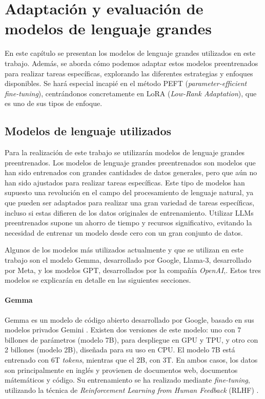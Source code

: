 \documentclass[11pt,spanish,listoffigures,listoftables]{tfgetsinf}
\begin{document}
\chapter{Adaptación y evaluación de modelos de lenguaje grandes} \label{cap3}

En este capítulo se presentan los modelos de lenguaje grandes utilizados en este trabajo. Además, se aborda cómo podemos adaptar estos modelos preentrenados para realizar tareas  específicas, explorando las diferentes estrategias y enfoques disponibles. Se hará especial incapié en el método PEFT  (\textit{parameter-efficient fine-tuning}), centrándonos concretamente en LoRA (\textit{Low-Rank Adaptation}), que es uno de sus tipos de enfoque.

\section{Modelos de lenguaje utilizados} \label{modelosUtilizados}

Para la realización de este trabajo se utilizarán modelos de lenguaje grandes preentrenados. Los modelos de lenguaje grandes preentrenados son modelos que han sido entrenados con grandes cantidades de datos generales, pero que aún no han sido ajustados para realizar tareas específicas. Este tipo de modelos han supuesto una revolución en el campo del procesamiento de lenguaje natural, ya que pueden ser adaptados para realizar una gran variedad de tareas específicas, incluso si estas difieren de los datos originales de entrenamiento. Utilizar LLMs preentrenados supone un ahorro de tiempo y recursos significativo, evitando la necesidad de entrenar un modelo desde cero con un gran conjunto de datos.

Algunos de los modelos más utilizados actualmente y que se utilizan en este trabajo son el modelo Gemma, desarrollado por Google, Llama-3, desarrollado por Meta, y los modelos GPT, desarrollados por la compañía \textit{OpenAI},. Estos tres modelos se explicarán en detalle en las siguientes secciones.

\subsubsection{Gemma}

Gemma \cite{gemmateam2024gemmaopenmodelsbased} es un modelo de código abierto desarrollado por Google, basado en sus modelos privados Gemini \cite{geminiteam2024geminifamilyhighlycapable}. Existen dos versiones de este modelo: uno con 7 billones de parámetros (modelo 7B), para despliegue en GPU y TPU, y otro con 2 billones (modelo 2B), diseñada para su uso en CPU. El modelo 7B está entrenado con 6T \textit {tokens}, mientras que el 2B, con 3T. En ambos casos, los datos son principalmente en inglés y provienen de documentos web, documentos mátemáticos y código. Su entrenamiento se ha realizado mediante \textit{fine-tuning}, utilizando la técnica de  \textit{Reinforcement Learning from Human Feedback} (RLHF) \cite{christiano2023deepreinforcementlearninghuman}.
\end{document}
